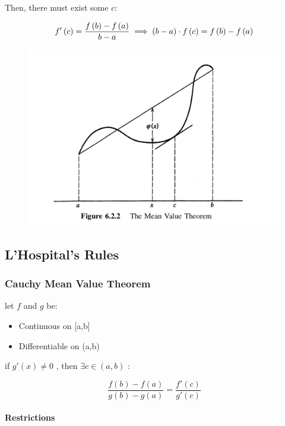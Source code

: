 \documentclass[class=article, crop=false]{standalone}
\begin{document}
Then, there must exist some \(c\):

\[f'\left( c \right) = \frac{f\left( b \right)-f\left( a \right)}{b-a} \\
\implies  \left( b-a \right) \cdot f\left( c \right) = f\left( b \right) - f\left( a \right)\]

\begin{figure}
\centering
\includegraphics[width=0.7\columnwidth]{media/Continuity/3256156E-84DC-4942-B3D3-B580180EEE50.jpeg}
\caption{}
\end{figure}

\newpage
\hypertarget{header-n4043}{%
\subsection{L'Hospital's Rules}\label{header-n4043}}

\hypertarget{header-n4044}{%
\subsubsection{Cauchy Mean Value Theorem}\label{header-n4044}}

let \(f\) and \(g\) be:

\begin{itemize}
\item
  Continuous on {[}a,b{]}
\item
  Differentiable on (a,b)
\end{itemize}

if \(g'(x)  \neq 0\) , then \(\exists c \in (a,b)\) :

\[\frac{f\left( b \right)-f\left( a \right)}{g\left( b \right) - g\left( a \right)} = \frac{f'\left( c \right)}{g'\left( c \right)}\]

\hypertarget{header-n4054}{%
\paragraph{Restrictions}\label{header-n4054}}
\end{document}
